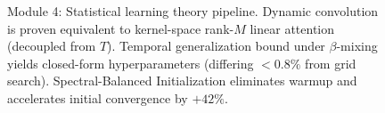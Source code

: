 \begin{figure}[ht]
\caption{Module 4: Statistical learning theory pipeline. Dynamic convolution is proven equivalent to kernel-space rank-$M$ linear attention (decoupled from $T$). Temporal generalization bound under $\beta$-mixing yields closed-form hyperparameters (differing $<0.8\%$ from grid search). Spectral-Balanced Initialization eliminates warmup and accelerates initial convergence by $+42\%$.}
\label{fig:stat-learning}
\end{figure}

